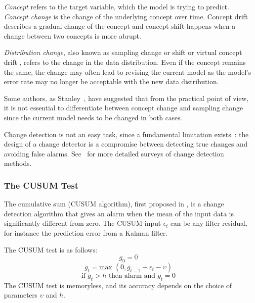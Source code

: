 \textit{Concept} refers to the target variable, which the model is trying to predict.
\textit{Concept change} is the change of the underlying concept over time.
Concept drift describes a gradual change of the concept
and concept shift happens when a change between two concepts is more abrupt. 

\textit{Distribution change}, also known as sampling
change or shift or virtual concept drift , refers to the change in the data distribution.
Even if the concept remains the same, the change may often lead to revising the
current model as the model's error rate may no longer be acceptable with the
new data distribution.

Some authors, as Stanley~\cite{stanley03learning}, have suggested that from the practical point of view, it is not
essential to differentiate between concept change and sampling change since the
current model needs to be changed in both cases.


Change detection is not an easy task, since a fundamental
limitation exists~\cite{Gustaffson:2000}: the design of a change detector
is a compromise between detecting true changes and avoiding false
alarms. 
See~\cite{Gustaffson:2000,Baseville93} for more detailed surveys of change detection methods.

\subsubsection{The CUSUM Test}
\label{Sscusum}

The cumulative sum (CUSUM algorithm), %
 first proposed in \cite{Page54}, 
is a change detection algorithm that gives an alarm when the mean of the input data is significantly 
different from zero. The CUSUM input $\epsilon_t$ can be any filter residual, for instance 
the prediction error from a Kalman filter.

The CUSUM test is as follows:
$$g_0=0$$
$$g_t=\mbox{max }(0,g_{t-1}+ \epsilon_t -\upsilon)$$
$$\mbox{if } g_t>h \mbox{ then alarm and } g_t=0$$
%
The CUSUM test is memoryless, and its accuracy depends on the choice of parameters $\upsilon$ and $h$.

